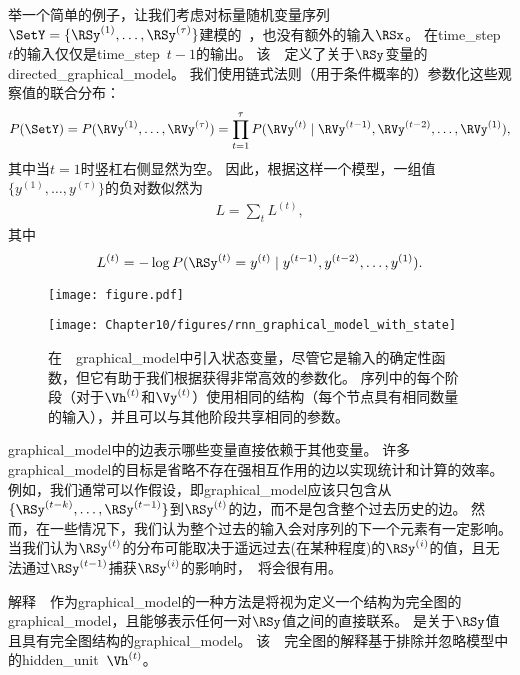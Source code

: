 举一个简单的例子，让我们考虑对标量随机变量序列$ \SetY = \{\RSy^{(1)},\dots,\RSy^{(\tau)}\}$建模的~，也没有额外的输入$\RSx$。
在\gls{time_step}~$t$的输入仅仅是\gls{time_step}~$t-1$的输出。
该~~定义了关于$\RSy$变量的\gls{directed_graphical_model}。
我们使用链式法则（用于条件概率的）参数化这些观察值的联合分布：
\begin{align}
 P(\SetY) = P(\RVy^{(1)},\dots,\RVy^{(\tau)}) = \prod_{t=1}^{\tau}P(\RVy^{(t)} \mid \RVy^{(t-1)},\RVy^{(t-2)},
 \dots,\RVy^{(1)}),
\end{align}
其中当$t=1$时竖杠右侧显然为空。
因此，根据这样一个模型，一组值$\{y^{(1)},\dots,y^{(\tau)} \}$的负对数似然为
\begin{align}
 L = \sum_{t} L^{(t)},
\end{align}
其中
\begin{align}
 L^{(t)} = -\log P(\RSy^{(t)} = y^{(t)} \mid y^{(t-1)},y^{(t-2)}, \dots, y^{(1)}).
\end{align}
\begin{figure}[!htb]
\ifOpenSource
\centerline{\texttt{[image: figure.pdf]}}
\else
\centerline{\texttt{[image: Chapter10/figures/rnn\_graphical\_model\_with\_state]}}
\fi
\caption{在~~\gls{graphical_model}中引入状态变量，尽管它是输入的确定性函数，但它有助于我们根据获得非常高效的参数化。
序列中的每个阶段（对于$\Vh^{(t)}$和$\Vy^{(t)}$）使用相同的结构（每个节点具有相同数量的输入），并且可以与其他阶段共享相同的参数。
}
\label{fig:chap10_rnn_graphical_model_with_state}
\end{figure}

\gls{graphical_model}中的边表示哪些变量直接依赖于其他变量。
许多\gls{graphical_model}的目标是省略不存在强相互作用的边以实现统计和计算的效率。
例如，我们通常可以作假设，即\gls{graphical_model}应该只包含从$\{ \RSy^{(t-k)}, \dots, \RSy^{(t-1)}\}$到$\RSy^{(t)}$的边，而不是包含整个过去历史的边。
然而，在一些情况下，我们认为整个过去的输入会对序列的下一个元素有一定影响。
当我们认为$\RSy^{(t)}$的分布可能取决于遥远过去(在某种程度)的$\RSy^{(i)}$的值，且无法通过$\RSy^{(t-1)}$捕获$\RSy^{(i)}$的影响时，~将会很有用。

解释~~作为\gls{graphical_model}的一种方法是将视为定义一个结构为完全图的\gls{graphical_model}，且能够表示任何一对$\RSy$值之间的直接联系。
是关于$\RSy$值且具有完全图结构的\gls{graphical_model}。
该~~完全图的解释基于排除并忽略模型中的\gls{hidden_unit}~$\Vh^{(t)}$。

